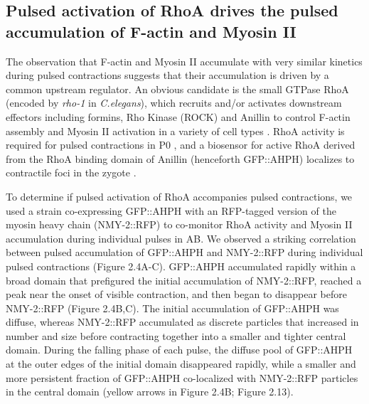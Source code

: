 \documentclass{ucetd}
\begin{document}
\subsection{Pulsed activation of RhoA drives the pulsed accumulation of F-actin and Myosin II}
The observation that F-actin and Myosin II accumulate with very similar kinetics during pulsed contractions suggests that their accumulation is driven by a common upstream regulator. An obvious candidate is the small GTPase RhoA (encoded by \textit{rho-1} in \textit{C.elegans}), which recruits and/or activates downstream effectors including formins, Rho Kinase (ROCK) and Anillin to control F-actin assembly and Myosin II activation in a variety of cell types \cite{Jaffe:2005kq, Piekny:2008jf}. RhoA activity is required for pulsed contractions in P0 \cite{Motegi:2006hi, Schonegg:2007if, Tse:2012fp}, and a biosensor for active RhoA derived from the RhoA binding domain of Anillin (henceforth GFP::AHPH) localizes to contractile foci in the zygote \cite{Tse:2011gd}. 

To determine if pulsed activation of RhoA accompanies pulsed contractions, we used a strain co-expressing GFP::AHPH \cite{Tse:2012fp} with an RFP-tagged version of the myosin heavy chain (NMY-2::RFP) to co-monitor RhoA activity and Myosin II accumulation during individual pulses in AB.  We observed a striking correlation between pulsed accumulation of GFP::AHPH and NMY-2::RFP during individual pulsed contractions (Figure 2.4A-C).  GFP::AHPH accumulated rapidly within a broad domain that prefigured the initial accumulation of NMY-2::RFP, reached a peak near the onset of visible contraction, and then began to disappear before NMY-2::RFP (Figure 2.4B,C). The initial accumulation of GFP::AHPH was diffuse, whereas NMY-2::RFP accumulated as discrete particles that increased in number and size before contracting together into a smaller and tighter central domain. During the falling phase of each pulse, the diffuse pool of GFP::AHPH at the outer edges of the initial domain disappeared rapidly, while a smaller and more persistent fraction of GFP::AHPH co-localized with NMY-2::RFP particles in the central domain (yellow arrows in Figure 2.4B; Figure 2.13).
\end{document}
